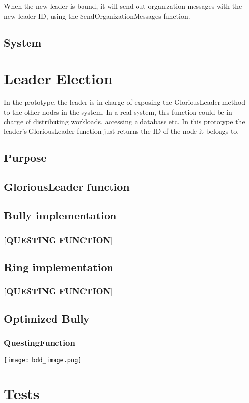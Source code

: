 \begin{center}
\end{center}

When the new leader is bound, it will send out organization messages with the new leader ID, using the SendOrganizationMessages function.

\subsection{System}

\section{Leader Election}
In the prototype, the leader is in charge of exposing the GloriousLeader method to the other nodes in the system. In a real system, this function could be in charge of distributing workloads, accessing a database etc. In this prototype the leader's GloriousLeader function just returns the ID of the node it belongs to. 
\subsection{Purpose}
\subsection{GloriousLeader function}
\subsection{Bully implementation}
\subsubsection{[QUESTING FUNCTION]}
\subsection{Ring implementation}
\subsubsection{[QUESTING FUNCTION]}
\subsection{Optimized Bully}
\subsubsection{QuestingFunction}




\begin{center}
	\texttt{[image: bdd\_image.png]}
\end{center}
\section{Tests}